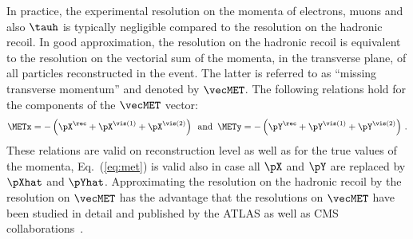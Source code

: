 In practice, the experimental resolution on the momenta of electrons, muons and also $\tauh$
is typically negligible compared to the resolution on the hadronic recoil.
In good approximation, the resolution on the hadronic recoil is equivalent
to the resolution on the vectorial sum of the momenta, in the transverse plane,
of all particles reconstructed in the event.
The latter is referred to as ``missing transverse momentum'' and denoted by $\vecMET$.
The following relations hold for the components of the $\vecMET$
vector:
\begin{equation}
\METx = - \left( \pX^{\rec} + \pX^{\vis(1)} + \pX^{\vis(2)} \right)
\, \mbox { and } \,
\METy = - \left( \pY^{\rec} + \pY^{\vis(1)} + \pY^{\vis(2)} \right) \, .
\label{eq:met}
\end{equation}
These relations are valid on reconstruction level as well as for the
true values of the momenta, \ie Eq.~(\ref{eq:met}) is valid also
in case all $\pX$ and $\pY$ are replaced by $\pXhat$ and $\pYhat$.
Approximating the resolution on the hadronic recoil by the resolution
on $\vecMET$ has the advantage that the resolutions on $\vecMET$ have
been studied in detail and published by the ATLAS as well as CMS collaborations~\cite{CMS-JME-13-003,ATLAS-CONF-2014-019}.

